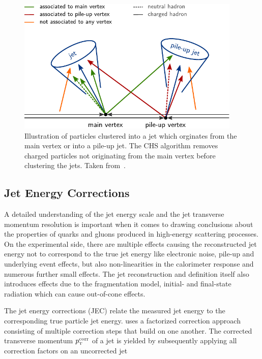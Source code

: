 \begin{figure}[h!tbp]
    \centering
    \includegraphics[width=0.95\textwidth]{figures/experimental_setup/chs.pdf}
    \caption[Charged Hadron Subtraction]{Illustration of particles clustered
    into a jet which orginates from the main vertex or into a pile-up jet. The
    CHS algorithm removes charged particles not originating from the main vertex
    before clustering the jets. Taken from~\cite{Berger:2014aca}.}
    \label{fig:chs_jets}
\end{figure}


\subsection{Jet Energy Corrections}
\label{sec:jec}

A detailed understanding of the jet energy scale and the jet transverse momentum
resolution is important when it comes to drawing conclusions about the
properties of quarks and gluons produced in high-energy scattering processes. On the
experimental side, there are multiple effects causing the reconstructed jet
energy not to correspond to the true jet energy like electronic noise, pile-up
and underlying event effects, but also non-linearities in the calorimeter
response and numerous further small effects. The jet reconstruction and
definition itself also introduces effects due to the fragmentation model,
initial- and final-state radiation which can cause out-of-cone effects.

The jet energy corrections (JEC) relate the measured jet energy to the
corresponding true particle jet energy. \CMS uses a factorized correction approach
consisting of multiple correction steps that build on one another. The corrected
transverse momentum $\pt^{\mathrm{corr}}$ of a jet is yielded by subsequently applying all correction
factors on an uncorrected jet

